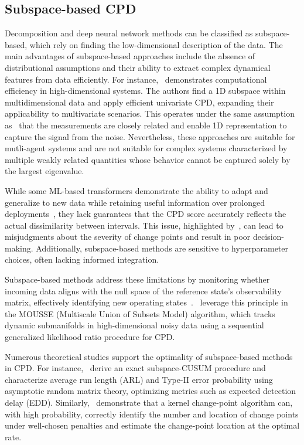 \subsection{Subspace-based CPD}\label{sec:subspace-based-cpd}
Decomposition and deep neural network methods can be classified as subspace-based, which rely on finding the low-dimensional description of the data. The main advantages of subspace-based approaches include the absence of distributional assumptions and their ability to extract complex dynamical features from data efficiently. For instance,~\cite{Hirabaru2016} demonstrates computational efficiency in high-dimensional systems. The authors find a 1D subspace within multidimensional data and apply efficient univariate CPD, expanding their applicability to multivariate scenarios. This operates under the same assumption as~\cite{Fathy2019} that the measurements are closely related and enable 1D representation to capture the signal from the noise. Nevertheless, these approaches are suitable for mutli-agent systems and are not suitable for complex systems characterized by multiple weakly related quantities whose behavior cannot be captured solely by the largest eigenvalue.

While some ML-based transformers demonstrate the ability to adapt and generalize to new data while retaining useful information over prolonged deployments~\cite{Corizzo2022}, they lack guarantees that the CPD score accurately reflects the actual dissimilarity between intervals. This issue, highlighted by~\cite{DeRyck2021}, can lead to misjudgments about the severity of change points and result in poor decision-making. Additionally, subspace-based methods are sensitive to hyperparameter choices, often lacking informed integration.

Subspace-based methods address these limitations by monitoring whether incoming data aligns with the null space of the reference state's observability matrix, effectively identifying new operating states~\cite{Dohler2013, Ye2023}.\ \cite{Xie2013} leverage this principle in the MOUSSE (Multiscale Union of Subsets Model) algorithm, which tracks dynamic submanifolds in high-dimensional noisy data using a sequential generalized likelihood ratio procedure for CPD\@.

Numerous theoretical studies support the optimality of subspace-based methods in CPD\@. For instance,~\cite{Ye2023} derive an exact subspace-CUSUM procedure and characterize average run length (ARL) and Type-II error probability using asymptotic random matrix theory, optimizing metrics such as expected detection delay (EDD). Similarly,~\cite{Garreau2018} demonstrate that a kernel change-point algorithm can, with high probability, correctly identify the number and location of change points under well-chosen penalties and estimate the change-point location at the optimal rate.


